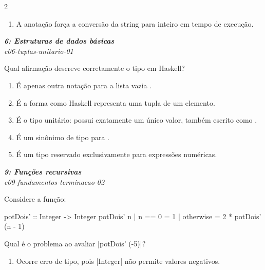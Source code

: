 \documentclass[a4paper,10pt,brazil]{article}
\begin{document}
\begin{multicols}{2}
\begin{enumerate}
  \item A anotação  força a conversão da string para inteiro em tempo de execução.


\end{enumerate}

\begin{flushright}
  \footnotesize
  \textit{\textbf{6: Estruturas de dados básicas}}\\
  \textit{c06-tuplas-unitario-01}\\

\end{flushright}
Qual afirmação descreve corretamente o tipo \haskellinline{()} em Haskell?

\begin{enumerate}
  \item É apenas outra notação para a lista vazia \haskellinline{[]}.

  \item É a forma como Haskell representa uma tupla de um elemento.

  \item É o tipo unitário: possui exatamente um único valor, também escrito como \haskellinline{()}.

  \item É um sinônimo de tipo para .

  \item É um tipo reservado exclusivamente para expressões numéricas.


\end{enumerate}

\begin{flushright}
  \footnotesize
  \textit{\textbf{9: Funções recursivas}}\\
  \textit{c09-fundamentos-terminacao-02}\\

\end{flushright}
Considere a função:
\begin{haskellcode}
potDois' :: Integer -> Integer
potDois' n
  | n == 0    = 1
  | otherwise = 2 * potDois' (n - 1)
\end{haskellcode}
Qual é o problema ao avaliar \haskellinline|potDois' (-5)|?

\begin{enumerate}
  \item Ocorre erro de tipo, pois \haskellinline|Integer| não permite valores negativos.


\end{enumerate}
\end{multicols}
\end{document}
